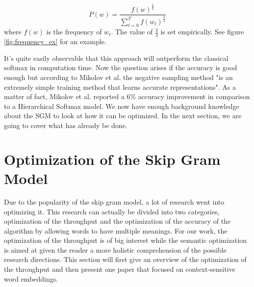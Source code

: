  \begin{equation} \label{eq:unigram}
P(w)=\frac{f(w)^{\frac{3}{4}}}{\sum_{t=0}^{T} f(w_t)^{\frac{3}{4}}}
\end{equation}
where $f(w)$ is the frequency of $w_t$. The value of $\frac{3}{4}$ is set empirically. See figure \ref{fig:frequency_ex} for an example.

It's quite easily observable that this approach will outperform the classical softmax in computation time. Now the question arises if the accuracy is good enough but according to Mikolov et al. \cite{mikolov2} the negative sampling method "is an extremely simple training method that learns accurate representations". As a matter of fact, Mikolov et al. \cite{mikolov2} reported a 6\% accuracy improvement in comparison to a Hierarchical Softmax model.
We now have enough background knowledge about the SGM to look at how it can be optimized. In the next section, we are going to cover what has already be done.

\section{Optimization of the Skip Gram Model}
Due to the popularity of the skip gram model, a lot of research went into optimizing it. This research can actually be divided into two categories, optimization of the throughput and the optimization of the accuracy of the algorithm by allowing words to have multiple meanings. For our work, the optimization of the throughput is of big interest while the semantic optimization is aimed at given the reader a more holistic comprehension of the possible research directions. 
This section will first give an overview of the optimization of the throughput and then present one paper that focused on context-sensitive word embeddings. 

